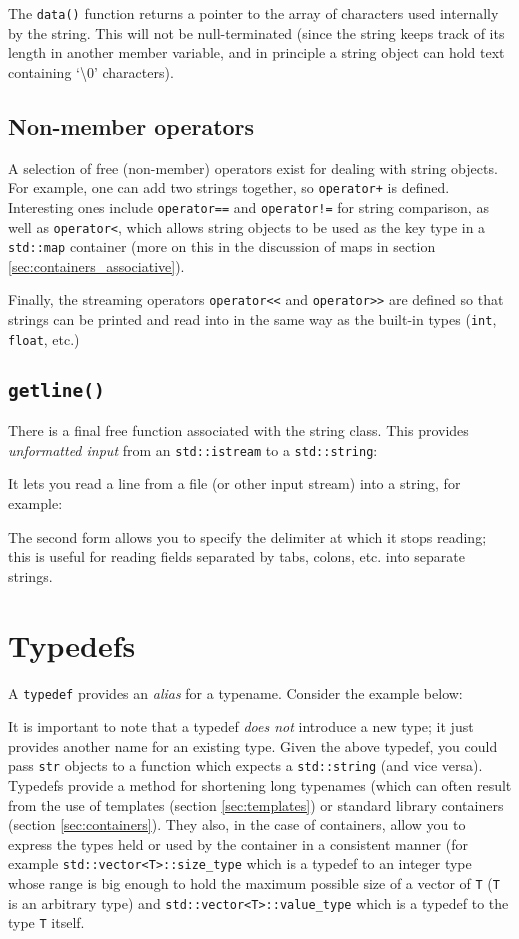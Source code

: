 \documentclass[a4paper]{scrartcl}
\begin{document}
The \texttt{data()} function returns a pointer to the array of characters used internally by the string. This will not be null-terminated (since the string keeps track of its length in another member variable, and in principle a string object can hold text containing `\textbackslash 0' characters).

\subsection{Non-member operators}
A selection of free (non-member) operators exist for dealing with string objects. For example, one can add two strings together, so \texttt{operator+} is defined. Interesting ones include \texttt{operator==} and \texttt{operator!=} for string comparison, as well as \texttt{operator<}, which allows string objects to be used as the key type in a \texttt{std::map} container (more on this in the discussion of maps in section \ref{sec:containers_associative}).

Finally, the streaming operators \verb|operator<<| and \verb|operator>>| are defined so that strings can be printed and read into in the same way as the built-in types (\texttt{int}, \texttt{float}, etc.)

\subsection{\texttt{getline()}}
There is a final free function associated with the string class. This provides \emph{unformatted input} from an \texttt{std::istream} to a \texttt{std::string}:


It lets you read a line from a file (or other input stream) into a string, for example:


The second form allows you to specify the delimiter at which it stops reading; this is useful for reading fields separated by tabs, colons, etc. into separate strings.

\section{Typedefs}\label{sec:typedefs}
A \verb|typedef| provides an \emph{alias} for a typename. Consider the example below:


It is important to note that a typedef \emph{does not} introduce a new type; it just provides another name for an existing type. Given the above typedef, you could pass \verb|str| objects to a function which expects a \verb|std::string| (and vice versa). Typedefs provide a method for shortening long typenames (which can often result from the use of templates (section \ref{sec:templates}) or standard library containers (section \ref{sec:containers}). They also, in the case of containers, allow you to express the types held or used by the container in a consistent manner (for example \verb|std::vector<T>::size_type| which is a typedef to an integer type whose range is big enough to hold the maximum possible size of a vector of \verb|T| (\verb|T| is an arbitrary type) and \verb|std::vector<T>::value_type| which is a typedef to the type \verb|T| itself.
\end{document}
